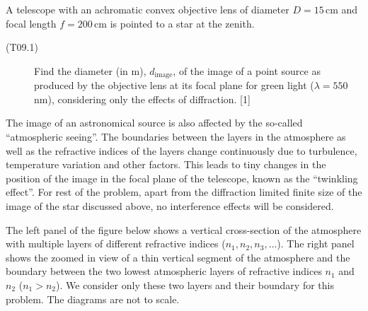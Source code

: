 A telescope with an achromatic convex objective lens of diameter
$D = 15$\,cm and focal length $f = 200$\,cm is pointed to a star at the
zenith.

\begin{description}
\item[(T09.1)] Find the diameter (in m), $d_{\mathrm{image}}$, of the image
  of a point source as produced by the objective lens at its focal plane for
  green light ($\lambda = 550$\,nm), considering only the effects of
  diffraction. \hfill[1]
\end{description}

The image of an astronomical source is also affected by the so-called
``atmospheric seeing''. The boundaries between the layers in the atmosphere
as well as the refractive indices of the layers change continuously due to
turbulence, temperature variation and other factors. This leads to tiny
changes in the position of the image in the focal plane of the telescope,
known as the ``twinkling effect''. For rest of the problem, apart from the
diffraction limited finite size of the image of the star discussed above, no
interference effects will be considered.

The left panel of the figure below shows a vertical cross-section of the
atmosphere with multiple layers of different refractive indices
($n_1, n_2, n_3, \ldots$). The right panel shows the zoomed in view of a
thin vertical segment of the atmosphere and the boundary between the two
lowest atmospheric layers of refractive indices $n_1$ and $n_2$
($n_1 > n_2$). We consider only these two layers and their boundary for this
problem. The diagrams are not to scale.


